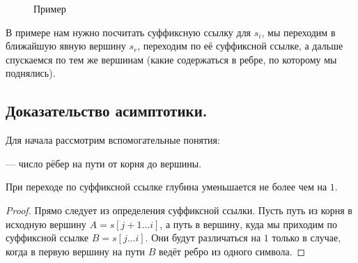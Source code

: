 \begin{figure}[H]
  \caption*{Пример}
  \begin{center}
  \end{center}
\end{figure}
В примере нам нужно посчитать суффиксную ссылку для $s_{i}$, мы переходим в ближайшую явную вершину
$s_{r}$, переходим по её суффиксной ссылке, а дальше спускаемся по тем же вершинам (какие содержаться в
ребре, по которому мы поднялись).

\subsection{Доказательство асимптотики.}
Для начала рассмотрим вспомогательные понятия:
\begin{definition}
   --- число рёбер на пути от корня до вершины.
\end{definition}

\begin{lemma}
  \label{4.3}
  При переходе по суффиксной ссылке глубина уменьшается не более чем на $1$. 
\end{lemma}
\begin{proof}
  Прямо следует из определения суффиксной ссылки. Пусть путь из корня в исходную вершину 
  $A = s[j + 1\ldots i]$, а путь в вершину, куда мы приходим по суффиксной ссылке $B = s[j\ldots i]$.
  Они будут различаться на $1$ только в случае, когда в первую вершину на пути $B$ ведёт
  ребро из одного символа.
\end{proof}

